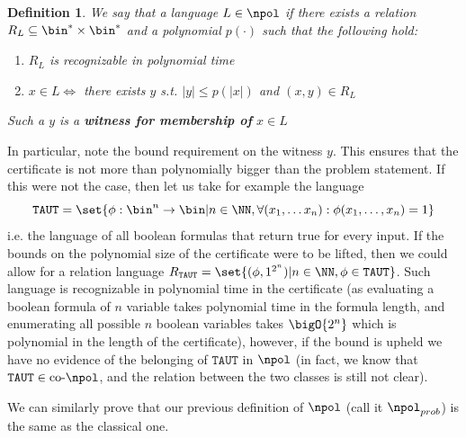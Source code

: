 \documentclass{article}
\newtheorem{definition}{Definition}
\begin{document}
\begin{definition}
    We say that a language $L \in \npol$ if there exists a relation $R_L \subseteq \bin^* \times \bin^*$ and a polynomial $p(\cdot)$ such that the following hold:
    \begin{enumerate}
        \item $R_L$ is recognizable in polynomial time
        \item $x \in L \iff$ there exists $y$ s.t. $|y| \leq p(|x|)$ and $(x, y) \in R_L$
    \end{enumerate}
    Such a $y$ is a \textbf{witness for membership of } $x \in L$
\end{definition}
In particular, note the bound requirement on the witness $y$. This ensures that the certificate is not more than polynomially bigger than the problem statement. If this were not the case, then let us take for example the language \[\texttt{TAUT} = \set{ \phi : \bin^n \to \bin | n \in \NN, \forall (x_1, \dots x_n): \phi(x_1, \dots, x_n) = 1}\]
i.e. the language of all boolean formulas that return true for every input. If the bounds on the polynomial size of the certificate were to be lifted, then we could allow for a relation language $R_{\texttt{TAUT}} = \set{ (\phi, 1^{2^n}) | n \in \NN, \phi \in \texttt{TAUT}  }$. Such language is recognizable in polynomial time in the certificate (as evaluating a boolean formula of $n$ variable takes polynomial time in the formula length, and enumerating all possible $n$ boolean variables takes $\bigO{2^n}$ which is polynomial in the length of the certificate), however, if the bound is upheld we have no evidence of the belonging of $\texttt{TAUT}$ in $\npol$ (in fact, we know that $\texttt{TAUT} \in \text{co-}\npol$, and the relation between the two classes is still not clear).

We can similarly prove that our previous definition of $\npol$ (call it $\npol_{prob}$) is the same as the classical one.
\end{document}
